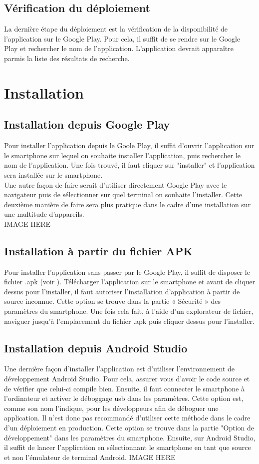 \documentclass[UTF8]{EPURapport}
\begin{document}
\section{Vérification du déploiement}
La dernière étape du déploiement est la vérification de la disponibilité de l'application sur le Google Play. Pour cela, il suffit de se rendre sur le Google Play et rechercher le nom de l'application. L'application devrait apparaître parmis la liste des résultats de recherche.

\chapter{Installation}
\section{Installation depuis Google Play}
Pour installer l'application depuis le Goole Play, il suffit d'ouvrir l'application sur le smartphone sur lequel on souhaite installer l'application, puis rechercher le nom de l'application. 
Une fois trouvé, il faut cliquer sur "installer" et l'application sera installée sur le smartphone. \\
Une autre façon de faire serait d'utiliser directement Google Play avec le navigateur puis de sélectionner sur quel terminal on souhaite l'installer. Cette deuxième manière de faire sera plus pratique dans le cadre d'une installation sur une multitude d'appareils. \\
IMAGE HERE
\section{Installation à partir du fichier APK}
Pour installer l'application sans passer par le Google Play, il suffit de disposer le fichier .apk (voir  ). Télécharger l'application sur le smartphone et avant de cliquer dessus pour l'installer, il faut autoriser l'installation d'application à partir de source inconnue. Cette option se trouve dans la partie « Sécurité » des paramètres du smartphone. Une fois cela fait, à l'aide d'un explorateur de fichier, naviguer jusqu'à l'emplacement du fichier .apk puis cliquer dessus pour l'installer.

\section{Installation depuis Android Studio}
Une dernière façon d'installer l'application est d'utiliser l'environnement de développement Android Studio. Pour cela, assurer vous d'avoir le code source et de vérifier que celui-ci compile bien. Ensuite, il faut connecter le smartphone à l'ordinateur et activer le déboggage usb dans les paramètres. Cette option est, comme son nom l’indique, pour les développeurs afin de déboguer une application. Il n'est donc pas recommandé d'utiliser cette méthode dans le cadre d'un déploiement en production. Cette option se trouve dans la partie "Option de développement" dans les paramètres du smartphone. Ensuite, sur Android Studio, il suffit de lancer l'application en sélectionnant le smartphone en tant que source et non l'émulateur de terminal Android.
IMAGE HERE
\end{document}
